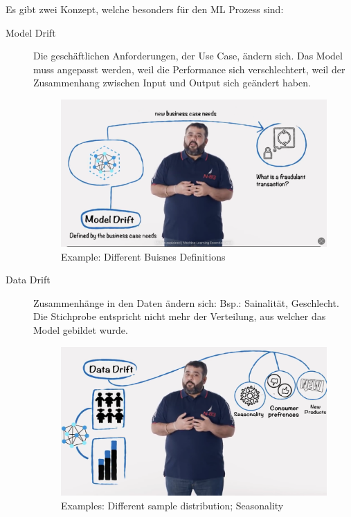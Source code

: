 Es gibt zwei Konzept, welche besonders für den ML Prozess sind:
\begin{description}
	\item[Model Drift] Die geschäftlichen Anforderungen, der Use Case, ändern sich. Das Model muss angepasst werden, weil die Performance sich verschlechtert, weil der Zusammenhang zwischen Input und Output sich geändert haben.
	\begin{figure}[H]
	\centering
	\includegraphics[scale = 0.1]{attachment/chapter_10/Scc027}
	\caption{Example: Different Buisnes Definitions}
\end{figure}
	\item[Data Drift] Zusammenhänge in den Daten ändern sich: Bsp.: Sainalität, Geschlecht. Die Stichprobe entspricht nicht mehr der Verteilung, aus welcher das Model gebildet wurde.
	\begin{figure}[H]
	\centering
	\includegraphics[scale = 0.1]{attachment/chapter_10/Scc026}
	\caption{Examples: Different sample distribution; Seasonality}
\end{figure}
\end{description}




